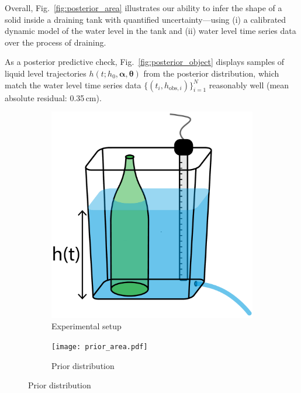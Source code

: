 \documentclass[openacc]{rsproca_new}%
\newcommand\thedata {$\{(t_i,h_{\text{obs}, i})\}_{i=1}^{N}$\xspace}
\newcommand\themodel {$h(t; h_0, \boldsymbol \alpha, \boldsymbol\theta)$\xspace}
\begin{document}
Overall, Fig.~\ref{fig:posterior_area} illustrates our ability to infer the shape of a solid inside a draining tank with quantified uncertainty---using (i) a calibrated dynamic model of the water level in the tank and (ii) water level time series data over the process of draining. %

As a posterior predictive check, Fig.~\ref{fig:posterior_object} displays samples of liquid level trajectories \themodel from the posterior distribution, which match the water level time series data \thedata reasonably well (mean absolute residual: 0.35\,cm). 

\begin{figure}[h!]
    \centering
        \begin{subfigure}[b]{0.3\textwidth}
    	\includegraphics[width=\textwidth]{tank_w_bottle.pdf}
	\caption{Experimental setup} \label{fig:tank_w_bottle}
    \end{subfigure}
     \begin{subfigure}[b]{0.49\textwidth}
    	\texttt{[image: prior\_area.pdf]}
	\caption{Prior distribution} \label{fig:prior_area}
    \end{subfigure}
    

\end{figure}
\end{document}
